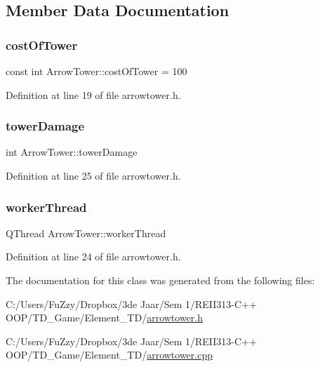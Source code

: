\subsection{Member Data Documentation}
\mbox{\label{class_arrow_tower_a5205aca3c7be32a30266f6e059857d90}} 
\subsubsection{\texorpdfstring{cost\+Of\+Tower}{costOfTower}}
{\footnotesize\ttfamily const int Arrow\+Tower\+::cost\+Of\+Tower = 100}



Definition at line 19 of file arrowtower.\+h.

\mbox{\label{class_arrow_tower_a3623752851bb010bb650ca63ed9dd26c}} 
\subsubsection{\texorpdfstring{tower\+Damage}{towerDamage}}
{\footnotesize\ttfamily int Arrow\+Tower\+::tower\+Damage\hspace{0.3cm}{\ttfamily [private]}}



Definition at line 25 of file arrowtower.\+h.

\mbox{\label{class_arrow_tower_a3264fff2b7ceb29032942c88e80e2a65}} 
\subsubsection{\texorpdfstring{worker\+Thread}{workerThread}}
{\footnotesize\ttfamily Q\+Thread Arrow\+Tower\+::worker\+Thread\hspace{0.3cm}{\ttfamily [private]}}



Definition at line 24 of file arrowtower.\+h.



The documentation for this class was generated from the following files\+:\begin{DoxyCompactItemize}
\item 
C\+:/\+Users/\+Fu\+Zzy/\+Dropbox/3de Jaar/\+Sem 1/\+R\+E\+I\+I313-\/\+C++ O\+O\+P/\+T\+D\+\_\+\+Game/\+Element\+\_\+\+T\+D/\hyperlink{arrowtower_8h}{arrowtower.\+h}\item 
C\+:/\+Users/\+Fu\+Zzy/\+Dropbox/3de Jaar/\+Sem 1/\+R\+E\+I\+I313-\/\+C++ O\+O\+P/\+T\+D\+\_\+\+Game/\+Element\+\_\+\+T\+D/\hyperlink{arrowtower_8cpp}{arrowtower.\+cpp}\end{DoxyCompactItemize}
